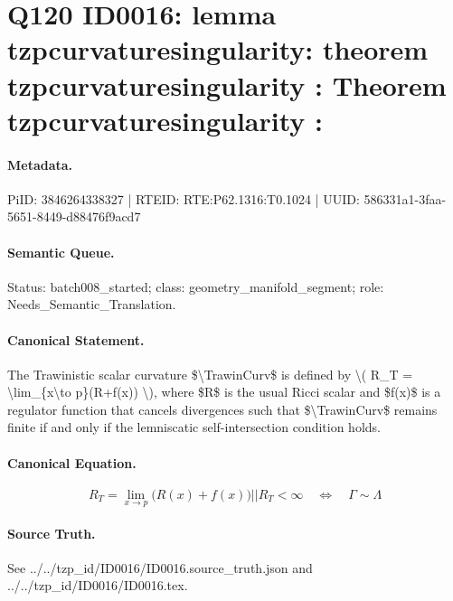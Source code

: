 \section*{Q120 ID0016: lemma tzpcurvaturesingularity: theorem tzpcurvaturesingularity : Theorem tzpcurvaturesingularity :}
\paragraph{Metadata.}
PiID: 3846264338327 | RTEID: RTE:P62.1316:T0.1024 | UUID: 586331a1-3faa-5651-8449-d88476f9acd7

\paragraph{Semantic Queue.}
Status: batch008\_started; class: geometry\_manifold\_segment; role: Needs\_Semantic\_Translation.

\paragraph{Canonical Statement.}
The Trawinistic scalar curvature \$\textbackslash{}TrawinCurv\$ is defined by \textbackslash{}( R\_T = \textbackslash{}lim\_\{x\textbackslash{}to p\}(R+f(x)) \textbackslash{}), where \$R\$ is the usual Ricci scalar and \$f(x)\$ is a regulator function that cancels divergences such that \$\textbackslash{}TrawinCurv\$ remains finite if and only if the lemniscatic self-intersection condition holds.

\paragraph{Canonical Equation.}
\[
R_{T} = \lim_{x \to p}\bigl(R(x)+f(x)\bigr) || R_{T} < \infty \quad \Longleftrightarrow \quad \Gamma \sim \Lambda
\]

\paragraph{Source Truth.}
See ../../tzp\_id/ID0016/ID0016.source\_truth.json and ../../tzp\_id/ID0016/ID0016.tex.
